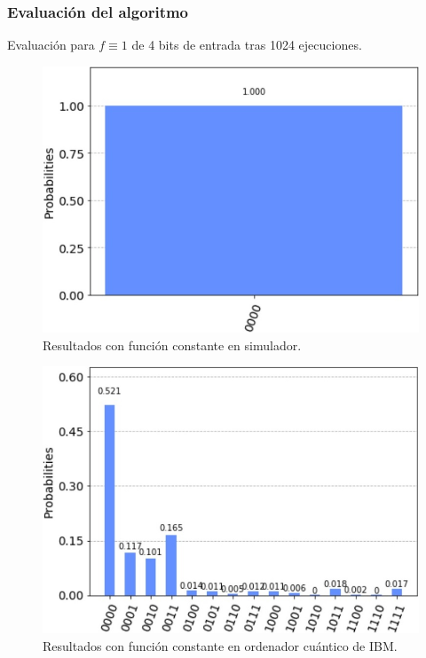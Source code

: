 \documentclass{beamer}
\begin{document}
\begin{frame}
\frametitle{Evaluación del algoritmo}
Evaluación para $f\equiv1$ de 4 bits de entrada tras 1024 ejecuciones. 
\begin{figure}[htb!]
    \centering
    \begin{minipage}{0.45\textwidth}
        \centering
        \includegraphics[width=1\textwidth]{../tex/images/simulator_constant}
        Resultados con función constante en simulador.
    \end{minipage}\hfill
    \begin{minipage}{0.45\textwidth}
        \centering
        \includegraphics[width=1\textwidth]{../tex/images/ibmq_constant}
        Resultados con función constante en ordenador cuántico de IBM.
    \end{minipage}
\end{figure}
\end{frame}
\end{document}
